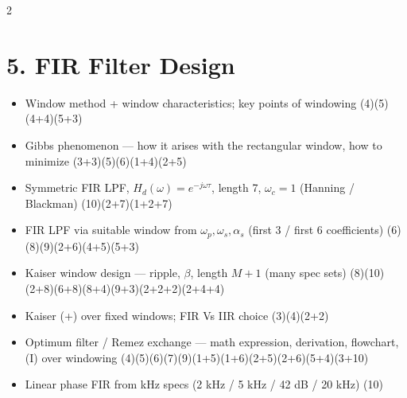 \documentclass[10pt]{article}
\begin{document}
\begin{multicols}{2}
\section*{5. FIR Filter Design}
\begin{itemize}
  \item Window method + window characteristics; key points of windowing \hfill (4)\allowbreak(5)\allowbreak(4+4)\allowbreak(5+3)
  \item Gibbs phenomenon --- how it arises with the rectangular window, how to minimize \hfill (3+3)\allowbreak(5)\allowbreak(6)\allowbreak(1+4)\allowbreak(2+5)
  \item Symmetric FIR LPF, $H_d(\omega)=e^{-j\omega\tau}$, length 7, $\omega_c=1$ (Hanning / Blackman) \hfill (10)\allowbreak(2+7)\allowbreak(1+2+7)
  \item FIR LPF via suitable window from $\omega_p,\omega_s,\alpha_s$ (first 3 / first 6 coefficients) \hfill (6)\allowbreak(8)\allowbreak(9)\allowbreak(2+6)\allowbreak(4+5)\allowbreak(5+3)
  \item Kaiser window design --- ripple, $\beta$, length $M{+}1$ (many spec sets) \hfill (8)\allowbreak(10)\allowbreak(2+8)\allowbreak(6+8)\allowbreak(8+4)\allowbreak(9+3)\allowbreak(2+2+2)\allowbreak(2+4+4)
  \item Kaiser (+) over fixed windows; FIR Vs IIR choice \hfill (3)\allowbreak(4)\allowbreak(2+2)
  \item Optimum filter / Remez exchange --- math expression, derivation, flowchart, (I) over windowing \hfill (4)\allowbreak(5)\allowbreak(6)\allowbreak(7)\allowbreak(9)\allowbreak(1+5)\allowbreak(1+6)\allowbreak(2+5)\allowbreak(2+6)\allowbreak(5+4)\allowbreak(3+10)
  \item Linear phase FIR from kHz specs (2 kHz / 5 kHz / 42 dB / 20 kHz) \hfill (10)
\end{itemize}


\end{multicols}
\end{document}

